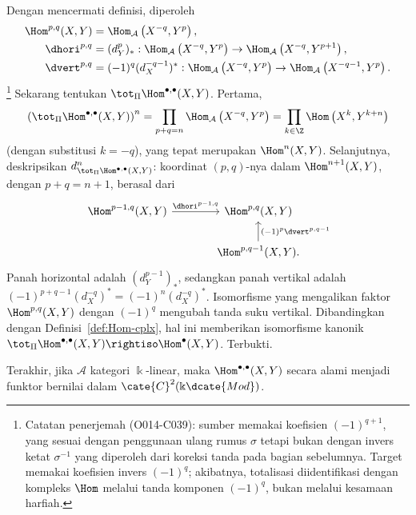 \begin{contoh}
	Dengan mencermati definisi, diperoleh
	\begin{equation*}\begin{aligned}
		\Hom^{p, q}(X, Y) & = \Hom_{\mathcal{A}}\left( X^{-q}, Y^p \right), \\
		\dhori^{p, q} & = (d_Y^p)_* : \Hom_{\mathcal{A}}\left( X^{-q}, Y^p \right) \to \Hom_{\mathcal{A}}\left( X^{-q}, Y^{p+1} \right), \\
		\dvert^{p, q} & = (-1)^q (d_X^{-q-1})^* : \Hom_{\mathcal{A}}\left( X^{-q}, Y^p \right) \to \Hom_{\mathcal{A}}\left( X^{-q-1}, Y^p \right).
	\end{aligned}\end{equation*}%
	\footnote{Catatan penerjemah (O014-C039): sumber memakai koefisien
	$(-1)^{q+1}$, yang sesuai dengan penggunaan ulang rumus $\sigma$ tetapi
	bukan dengan invers ketat $\sigma^{-1}$ yang diperoleh dari koreksi tanda
	pada bagian sebelumnya. Target memakai koefisien invers
	$(-1)^q$; akibatnya, totalisasi diidentifikasi dengan kompleks $\Hom$
	melalui tanda komponen $(-1)^q$, bukan melalui kesamaan harfiah.}
	Sekarang tentukan $\tot_{\Pi}\Hom^{\bullet,\bullet}(X,Y)$. Pertama,
	\[ \left(\tot_{\Pi} \Hom^{\bullet, \bullet}(X, Y)\right)^n = \prod_{p+q=n} \Hom_{\mathcal{A}}\left( X^{-q}, Y^p \right) = \prod_{k \in \Z} \Hom\left( X^k, Y^{k+n} \right) \]
	(dengan substitusi $k=-q$), yang tepat merupakan $\Hom^n(X,Y)$.
	Selanjutnya, deskripsikan
	$d_{\tot_{\Pi}\Hom^{\bullet,\bullet}(X,Y)}^n$: koordinat $(p,q)$-nya
	dalam $\Hom^{n+1}(X,Y)$, dengan $p+q=n+1$, berasal dari
	\[\begin{tikzcd}[column sep=large]
		\Hom^{p-1, q}(X, Y) \arrow[r, "{\dhori^{p-1, q}}"] & \Hom^{p, q}(X, Y) \\
		& \Hom^{p, q-1}(X, Y) \arrow[u, "{(-1)^p \dvert^{p, q-1}}"'] .
	\end{tikzcd}\]
	Panah horizontal adalah $(d_Y^{p-1})_*$, sedangkan panah vertikal adalah
	$(-1)^{p+q-1}(d_X^{-q})^*=(-1)^n(d_X^{-q})^*$. Isomorfisme yang
	mengalikan faktor $\Hom^{p,q}(X,Y)$ dengan $(-1)^q$ mengubah tanda suku
	vertikal. Dibandingkan dengan Definisi~\ref{def:Hom-cplx}, hal ini
	memberikan isomorfisme kanonik
	$\tot_{\Pi}\Hom^{\bullet,\bullet}(X,Y)\rightiso\Hom^\bullet(X,Y)$.
	Terbukti.

	Terakhir, jika $\mathcal{A}$ kategori $\Bbbk$-linear, maka
	$\Hom^{\bullet,\bullet}(X,Y)$ secara alami menjadi funktor bernilai dalam
	$\cate{C}^2(\Bbbk\dcate{Mod})$.
\end{contoh}
